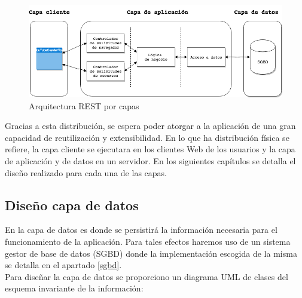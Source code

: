 \documentclass[11pt,a4paper]{article}
\begin{document}
\begin{figure}[H]
\centering
\includegraphics[scale=0.40]{diseno/ArquitecturaRESTPorCapas.png}
\caption{Arquitectura REST por capas}
\end{figure}

Gracias a esta distribución, se espera poder atorgar a la aplicación de una gran capacidad de reutilización y extensibilidad. En lo que ha distribución física se refiere, la capa cliente se ejecutara en los clientes Web de los usuarios y la capa de aplicación y de datos en un servidor. En los siguientes capítulos se detalla el diseño realizado para cada una de las capas.
\medskip 

\subsection{Diseño capa de datos}
En la capa de datos es donde se persistirá la información necesaria para el funcionamiento de la aplicación. Para tales efectos haremos uso de un sistema gestor de base de datos (SGBD) donde la implementación escogida de la misma se detalla en el apartado \ref{sgbd}.
\\

Para diseñar la capa de datos se proporciono un diagrama UML de clases del esquema invariante de la información:
\end{document}
